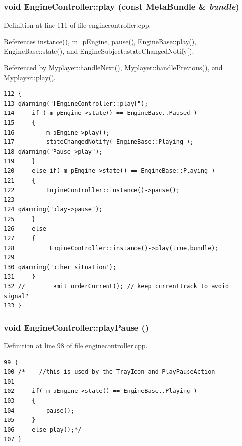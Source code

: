 \subsubsection{\setlength{\rightskip}{0pt plus 5cm}void Engine\-Controller::play (const {\bf Meta\-Bundle} \& {\em bundle})\hspace{0.3cm}{\tt  [slot]}}\label{classEngineController_EngineControlleri2}




Definition at line 111 of file enginecontroller.cpp.

References instance(), m\_\-p\-Engine, pause(), Engine\-Base::play(), Engine\-Base::state(), and Engine\-Subject::state\-Changed\-Notify().

Referenced by Myplayer::handle\-Next(), Myplayer::handle\-Previous(), and Myplayer::play().



\footnotesize\begin{verbatim}112 {
113 qWarning("[EngineController::play]");
114     if ( m_pEngine->state() == EngineBase::Paused )
115     {
116         m_pEngine->play();
117         stateChangedNotify( EngineBase::Playing );
118 qWarning("Pause->play");        
119     }
120     else if( m_pEngine->state() == EngineBase::Playing )
121     {
122         EngineController::instance()->pause();  
123         
124 qWarning("play->pause");        
125     }
126     else 
127     {
128          EngineController::instance()->play(true,bundle);
129         
130 qWarning("other situation");    
131     }   
132 //        emit orderCurrent(); // keep currenttrack to avoid signal?
133 }
\end{verbatim}\normalsize 
{}
\subsubsection{\setlength{\rightskip}{0pt plus 5cm}void Engine\-Controller::play\-Pause ()\hspace{0.3cm}{\tt  [slot]}}\label{classEngineController_EngineControlleri6}




Definition at line 98 of file enginecontroller.cpp.



\footnotesize\begin{verbatim}99 {
100 /*    //this is used by the TrayIcon and PlayPauseAction
101 
102     if( m_pEngine->state() == EngineBase::Playing )
103     {
104         pause();
105     }
106     else play();*/
107 }
\end{verbatim}\normalsize 
{}
